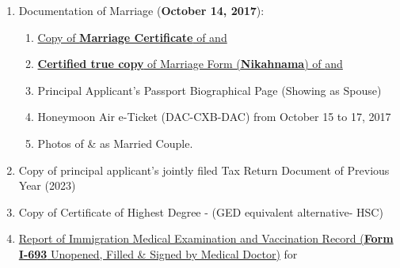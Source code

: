 \begin{enumerate}[label=\textbf{ Exhibit-\arabic*},start=15]
    \item Documentation of Marriage (\textbf{October 14, 2017}):
    \begin{enumerate}[label=\roman*.]
        \item \hyperref[exhibit12a]{Copy of \textbf{Marriage Certificate} of \textit{\pApplicant} and \textit{\dApplicant}}
        \item \hyperref[exhibit12b]{\textbf{Certified true copy} of Marriage Form (\textbf{Nikahnama}) of \textit{\pApplicant} and \textit{\dApplicant}}
        \item Principal Applicant's Passport Biographical Page (Showing \textit{\dApplicant} as Spouse)
        \item Honeymoon Air e-Ticket (DAC-CXB-DAC) from October 15 to 17, 2017
        \item Photos of \textit{\pApplicant} \& \textit{\dApplicant} as Married Couple.
    \end{enumerate}

    \item Copy of principal applicant's jointly filed Tax Return Document of Previous Year (2023)

    \item Copy of Certificate of Highest Degree - (GED equivalent alternative- HSC)
    \item \hyperref[exhibit14]{Report of Immigration Medical Examination and Vaccination Record (\textbf{Form I-693} Unopened, Filled \& Signed by Medical Doctor)} for \textit{\dApplicant}
\end{enumerate}